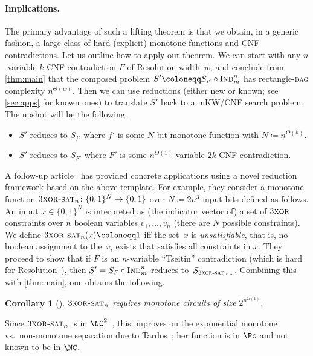 \documentclass[11pt]{article}
\numberwithin{equation}{section}
\newtheorem{corollary}[theorem]{Corollary}
\theoremstyle{definition}
\theoremstyle{plain}
\newcommand{\Ind}{\textsc{Ind}}
\newcommand{\DAGspace}{\textsc{dag}\xspace}
\newcommand{\Xor}{\textsc{xor}}
\newcommand{\XorSat}{\textsc{xor-sat}}
\newcommand{\ThreeXor}{3\Xor}
\newcommand{\ThreeXorSat}{3\XorSat}
\newcommand{\bit}{\{0,1\}}
\begin{document}
\paragraph{Implications.}
The primary advantage of such a lifting theorem is that we obtain, in a generic fashion, a large class of hard (explicit) monotone functions and CNF contradictions. Let us outline how to apply our theorem. We can start with any $n$-variable $k$-CNF contradiction $F$ of Resolution width~$w$, and conclude from \autoref{thm:main} that the composed problem $S'\coloneqq S_F\circ\Ind^n_m$ has rectangle-\DAGspace complexity $n^{\Theta(w)}$. Then we can use reductions (either new or known; see \autoref{sec:apps} for known ones) to translate $S'$ back to a mKW/CNF search problem. The upshot will be 
%
the following.   %
\begin{itemize}
\item $S'$ reduces to $S_{f'}$ where $f'$ is some $N$-bit monotone function with $N\coloneqq n^{O(k)}$.
\item $S'$ reduces to $S_{F'}$ where $F'$ is some $n^{O(1)}$-variable $2k$-CNF contradiction. 
\end{itemize}

A follow-up
%
article~\cite{goos19monotone}  %
has provided concrete applications using a novel reduction framework based on the above template. For example, they consider a monotone function $\ThreeXorSat_n\colon\bit^N\to\bit$ over $N\coloneqq 2n^3$ input bits defined as follows. An input $x\in\bit^N$ is interpreted as (the indicator vector of) a set of $\ThreeXor$ constraints over $n$ boolean variables $v_1,\ldots,v_n$ (there are $N$ possible constraints). We define $\ThreeXorSat_n(x)\coloneqq 1$ iff the set~$x$ is \emph{unsatisfiable}, that is, no boolean assignment to the~$v_i$ exists that satisfies all constraints in $x$. They proceed to show that if $F$ is an $n$-variable ``Tseitin'' contradiction (which is hard for Resolution~\cite{urquhart87hard}), then $S'=S_F \circ \Ind_m^n$ reduces to~$S_{\ThreeXorSat_{mn}}$. Combining this with \autoref{thm:main}, one obtains the following.

\begin{corollary}[{\cite[Thm.~1]{goos19monotone}}]\label{cor:xorsat-lb}
$\ThreeXorSat_n$ requires monotone circuits of size $2^{n^{\Omega(1)}}$.
\end{corollary}

Since $\ThreeXorSat_n$ is in $\NC^2$~\cite{mulmuley87fast}, this improves on the exponential monotone vs.\ non-mono\-tone separation due to Tardos~\cite{tardos88gap}; her function is in $\Pc$ and not known to be in $\NC$.
\end{document}

